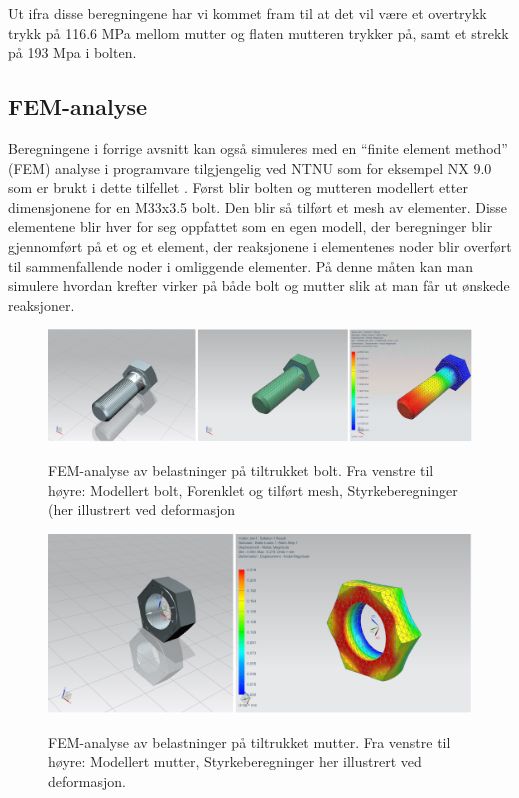 Ut ifra disse beregningene har vi kommet fram til at det vil være et overtrykk trykk på 116.6 MPa mellom mutter og flaten mutteren trykker på, samt et strekk på 193 Mpa i bolten.

\subsection{FEM-analyse}

Beregningene i forrige avsnitt kan også simuleres med en ``finite element method'' (FEM) analyse i programvare tilgjengelig ved NTNU som for eksempel NX 9.0 som er brukt i dette tilfellet \cite{FEManalyse}. Først blir bolten og mutteren modellert etter dimensjonene for en M33x3.5 bolt. Den blir så tilført et mesh av elementer. Disse elementene blir hver for seg oppfattet som en egen modell, der beregninger blir gjennomført på et og et element, der reaksjonene i elementenes noder blir overført til sammenfallende noder i omliggende elementer. På denne måten kan man simulere hvordan krefter virker på både bolt og mutter slik at man får ut ønskede reaksjoner.

\begin{figure}[H]
		\centering
		\includegraphics[width=1.00\textwidth]{images/Rapportbilde_skrue.png}
		\label{fig:FEMskrue}
		\caption{FEM-analyse av belastninger på tiltrukket bolt. Fra venstre til høyre: Modellert bolt, Forenklet og tilført mesh, Styrkeberegninger (her illustrert ved deformasjon}
	\end{figure}
\begin{figure}[H]
		\centering
		\includegraphics[width=1.00\textwidth]{images/Rapportbilde_mutter.png}
		\label{fig:FEMmutter}
		\caption{FEM-analyse av belastninger på tiltrukket mutter. Fra venstre til høyre: Modellert mutter, Styrkeberegninger her illustrert ved deformasjon.}
	\end{figure}

 